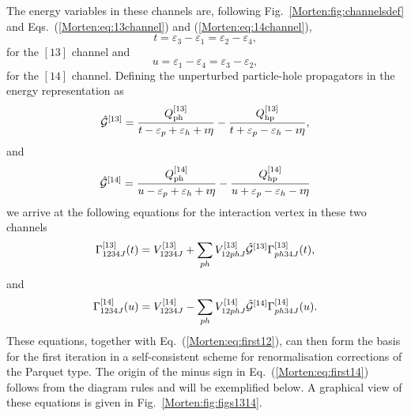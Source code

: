 The energy variables in these channels are, following
Fig.~\ref{Morten:fig:channelsdef} and Eqs.~(\ref{Morten:eq:13channel}) and
(\ref{Morten:eq:14channel}),
\begin{equation} 
     t=\varepsilon_3-\varepsilon_1=\varepsilon_2-\varepsilon_4,
\end{equation}    
for the $[13]$ channel and
\begin{equation}
     u=\varepsilon_1-\varepsilon_4=\varepsilon_3-\varepsilon_2,
\end{equation}
for the $[14]$ channel.
Defining the unperturbed particle-hole propagators 
in the energy representation as \cite{Morten:kt94}
\begin{equation}
    \hat{{\cal G}}^{[13]}=
    \frac{Q^{[13]}_{\mathrm{ph}}}{t-\varepsilon_p+\varepsilon_h+\imath \eta}
    -\frac{Q^{[13]}_{\mathrm{hp}}}{t+\varepsilon_p-\varepsilon_h-\imath \eta},
    \label{Morten:eq:paulioperator13}
\end{equation}
and 
\begin{equation}
    \hat{{\cal G}}^{[14]}=
    \frac{Q^{[14]}_{\mathrm{ph}}}{u-\varepsilon_p+\varepsilon_h+\imath \eta}
    -\frac{Q^{[14]}_{\mathrm{hp}}}{u+\varepsilon_p-\varepsilon_h-\imath \eta}
    \label{Morten:eq:paulioperator14}
\end{equation}
we arrive at the following equations 
for the interaction vertex in these two channels
\begin{equation}
      \Gamma^{[13]}_{1234J}(t) = 
      V^{[13]}_{1234J}+
      \sum_{ph}
      V^{[13]}_{12phJ}\hat{{\cal G}}^{[13]}
      \Gamma^{[13]}_{ph34J}(t),
      \label{Morten:eq:first13}
\end{equation}
and 
\begin{equation}
      \Gamma^{[14]}_{1234J}(u) = 
      V^{[14]}_{1234J}-
      \sum_{ph}
      V^{[14]}_{12phJ}\hat{{\cal G}}^{[14]}
      \Gamma^{[14]}_{ph34J}(u).
      \label{Morten:eq:first14}
\end{equation}
These equations, together with Eq.~(\ref{Morten:eq:first12}),
can then form the basis for the first iteration in a self-consistent 
scheme for renormalisation corrections of the Parquet type.
The origin of the minus sign in Eq.~(\ref{Morten:eq:first14}) follows from 
the diagram rules \cite{Morten:kstop81} and will be exemplified below.
A graphical view of these equations is given in Fig.~\ref{Morten:fig:figs1314}.
